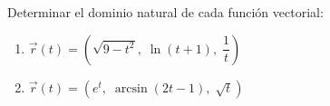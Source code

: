 Determinar el dominio natural de cada función vectorial:
\begin{enumerate}
    \item $\vec{r}(t) = \left(\sqrt{9 - t^2},\; \ln(t + 1),\; \dfrac{1}{t}\right)$
    \item $\vec{r}(t) = \left(e^t,\; \arcsin(2t - 1),\; \sqrt{t}\right)$
\end{enumerate}